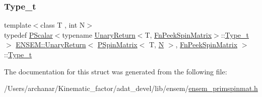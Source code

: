 \mbox{\label{structENSEM_1_1UnaryReturn_3_01PSpinMatrix_3_01T_00_01N_01_4_00_01FnPeekSpinMatrix_01_4_a1a718fe587d03e5619b75af54e2a19a3}} 
\subsubsection{\texorpdfstring{Type\_t}{Type\_t}\hspace{0.1cm}{\footnotesize\ttfamily [2/2]}}
{\footnotesize\ttfamily template$<$class T , int N$>$ \\
typedef \mbox{\hyperlink{classENSEM_1_1PScalar}{P\+Scalar}}$<$typename \mbox{\hyperlink{structENSEM_1_1UnaryReturn}{Unary\+Return}}$<$T, \mbox{\hyperlink{structENSEM_1_1FnPeekSpinMatrix}{Fn\+Peek\+Spin\+Matrix}}$>$\+::\mbox{\hyperlink{structENSEM_1_1UnaryReturn_3_01PSpinMatrix_3_01T_00_01N_01_4_00_01FnPeekSpinMatrix_01_4_a1a718fe587d03e5619b75af54e2a19a3}{Type\+\_\+t}}$>$ \mbox{\hyperlink{structENSEM_1_1UnaryReturn}{E\+N\+S\+E\+M\+::\+Unary\+Return}}$<$ \mbox{\hyperlink{classENSEM_1_1PSpinMatrix}{P\+Spin\+Matrix}}$<$ T, \mbox{\hyperlink{operator__name__util_8cc_a7722c8ecbb62d99aee7ce68b1752f337}{N}} $>$, \mbox{\hyperlink{structENSEM_1_1FnPeekSpinMatrix}{Fn\+Peek\+Spin\+Matrix}} $>$\+::\mbox{\hyperlink{structENSEM_1_1UnaryReturn_3_01PSpinMatrix_3_01T_00_01N_01_4_00_01FnPeekSpinMatrix_01_4_a1a718fe587d03e5619b75af54e2a19a3}{Type\+\_\+t}}}



The documentation for this struct was generated from the following file\+:\begin{DoxyCompactItemize}
\item 
/\+Users/archanar/\+Kinematic\+\_\+factor/adat\+\_\+devel/lib/ensem/\mbox{\hyperlink{lib_2ensem_2ensem__primspinmat_8h}{ensem\+\_\+primspinmat.\+h}}\end{DoxyCompactItemize}
